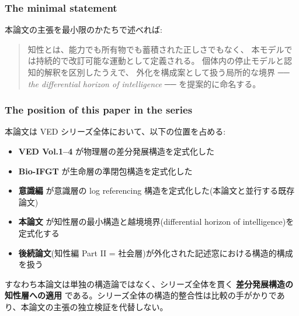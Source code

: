 \subsubsection{The minimal statement}


本論文の主張を最小限のかたちで述べれば:

\begin{quote}
知性とは、能力でも所有物でも蓄積された正しさでもなく、
本モデルでは持続的で改訂可能な運動として定義される。
個体内の停止モデルと認知的解釈を区別したうえで、
外化を構成案として扱う局所的な境界 ──
\emph{the differential horizon of intelligence} ──
を提案的に命名する。
\end{quote}

\subsubsection{The position of this paper in the series}


本論文は VED シリーズ全体において、以下の位置を占める:

\begin{itemize}
\item \textbf{VED Vol.1–4} が物理層の差分発展構造を定式化した
\item \textbf{Bio-IFGT} が生命層の準閉包構造を定式化した
\item \textbf{意識編} が意識層の log referencing 構造を定式化した(本論文と並行する既存論文)
\item \textbf{本論文} が知性層の最小構造と越境境界(differential horizon of intelligence)を定式化する
\item \textbf{後続論文}(知性編 Part II = 社会層)が外化された記述窓における構造的構成を扱う
\end{itemize}

すなわち本論文は単独の構造論ではなく、シリーズ全体を貫く \textbf{差分発展構造の知性層への適用} である。シリーズ全体の構造的整合性は比較の手がかりであり、本論文の主張の独立検証を代替しない。

